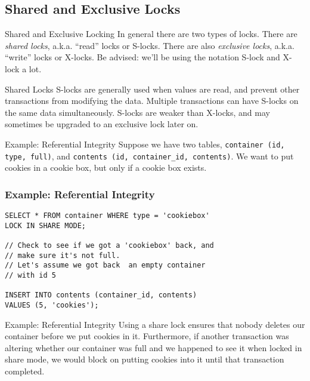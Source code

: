 \documentclass[14pt]{beamer}
\begin{document}
\subsection{Shared and Exclusive Locks}

\begin{frame}{Shared and Exclusive Locking}
  In general there are two types of locks. There are \emph{shared locks}, a.k.a.
  ``read'' locks or S-locks.
  \newline
  \newline
  There are also \emph{exclusive locks}, a.k.a. ``write'' locks or X-locks.
  \newline
  \newline
  \pause
  Be advised: we'll be using the notation S-lock and X-lock a lot.
\end{frame}

\begin{frame}{Shared Locks}
  S-locks are generally used when values are read, and prevent other
  transactions from modifying the data. Multiple transactions can have S-locks
  on the same data simultaneously.
  \newline
  \newline
  S-locks are weaker than X-locks, and may sometimes be upgraded to
  an exclusive lock later on.
\end{frame}

\begin{frame}{Example: Referential Integrity}
  Suppose we have two tables, \texttt{container (id, type, full)}, and
  \texttt{contents (id, container\_id, contents)}. We want to put cookies in a
  cookie box, but only if a cookie box exists.
\end{frame}

\begin{frame}[fragile]
  \frametitle{Example: Referential Integrity}
  \begingroup
    \fontsize {10pt}{12pt}\selectfont
    \begin{verbatim}
SELECT * FROM container WHERE type = 'cookiebox' 
LOCK IN SHARE MODE;

// Check to see if we got a 'cookiebox' back, and 
// make sure it's not full.
// Let's assume we got back  an empty container 
// with id 5

INSERT INTO contents (container_id, contents) 
VALUES (5, 'cookies');
    \end{verbatim}
  \endgroup 
\end{frame}

\begin{frame}{Example: Referential Integrity}
  Using a share lock ensures that nobody deletes our container before we put
  cookies in it. Furthermore, if another transaction was altering whether our
  container was full and we happened to see it when locked in share mode, we
  would block on putting cookies into it until that transaction completed.
\end{frame}
\end{document}
